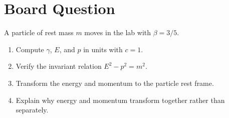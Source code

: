 \documentclass[12pt]{article}
\newif\ifshowboardanswers
\newcommand{\boardanswer}[1]{\ifshowboardanswers\\[0.35em]\textcolor{blue}{\textbf{Answer.} #1}\fi}
\begin{document}
\section*{Board Question}
\begin{tcolorbox}[colback=blue!5!white]
A particle of rest mass $m$ moves in the lab with $\beta=3/5$.
\begin{enumerate}
    \item Compute $\gamma$, $E$, and $p$ in units with $c=1$.
    \boardanswer{$\gamma=1/\sqrt{1-9/25}=5/4$, so $E=\gamma m=5m/4$ and $p=\gamma m\beta=3m/4$.}
    \item Verify the invariant relation $E^2-p^2=m^2$.
    \boardanswer{$E^2-p^2=(25m^2/16)-(9m^2/16)=m^2$.}
    \item Transform the energy and momentum to the particle rest frame.
    \boardanswer{Boosting with the particle gives $p'=0$ and $E'=m$, as expected for the rest frame.}
    \item Explain why energy and momentum transform together rather than separately.
    \boardanswer{They are components of the four-momentum $P=(E,{\bf p})$. A Lorentz transformation mixes temporal and spatial components.}
\end{enumerate}
\end{tcolorbox}
\fi
\end{document}
